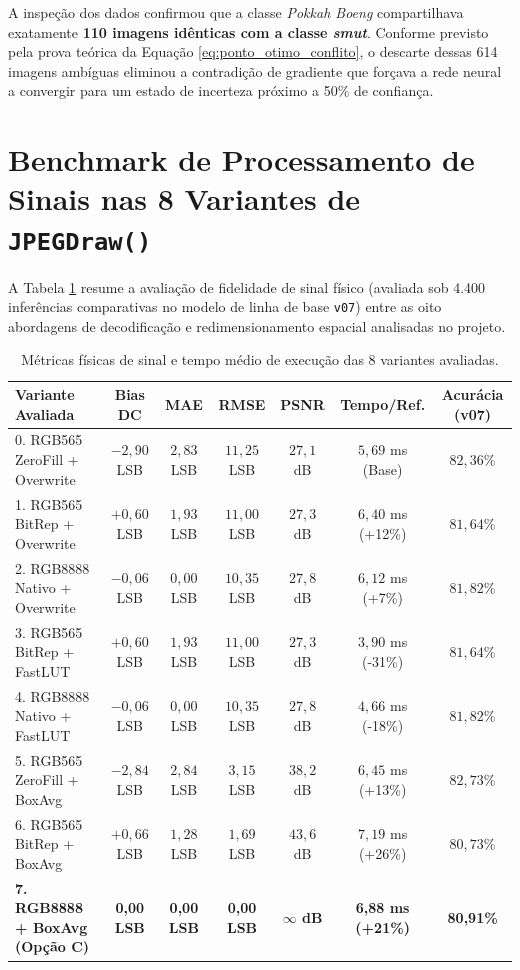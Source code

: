 A inspeção dos dados confirmou que a classe \textit{Pokkah Boeng} compartilhava exatamente \textbf{110 imagens idênticas com a classe \textit{smut}}. Conforme previsto pela prova teórica da Equação \ref{eq:ponto_otimo_conflito}, o descarte dessas 614 imagens ambíguas eliminou a contradição de gradiente que forçava a rede neural a convergir para um estado de incerteza próximo a 50\% de confiança.

\section{Benchmark de Processamento de Sinais nas 8 Variantes de \texttt{JPEGDraw()}}

A Tabela \ref{tab:benchmark_jpegdraw} resume a avaliação de fidelidade de sinal físico (avaliada sob 4.400 inferências comparativas no modelo de linha de base \texttt{v07}) entre as oito abordagens de decodificação e redimensionamento espacial analisadas no projeto.

\begin{table}[H]
\centering
\small
\caption{Métricas físicas de sinal e tempo médio de execução das 8 variantes avaliadas.}
\label{tab:benchmark_jpegdraw}
\begin{tabular}{lcccccc}
\toprule
\textbf{Variante Avaliada} & \textbf{Bias DC} & \textbf{MAE} & \textbf{RMSE} & \textbf{PSNR} & \textbf{Tempo/Ref.} & \textbf{Acurácia (v07)} \\
\midrule
0. RGB565 ZeroFill + Overwrite  & $-2,90$ LSB & $2,83$ LSB & $11,25$ LSB & $27,1$ dB & $5,69$ ms (Base) & $82,36\%$ \\
1. RGB565 BitRep + Overwrite    & $+0,60$ LSB & $1,93$ LSB & $11,00$ LSB & $27,3$ dB & $6,40$ ms (+12\%) & $81,64\%$ \\
2. RGB8888 Nativo + Overwrite   & $-0,06$ LSB & $0,00$ LSB & $10,35$ LSB & $27,8$ dB & $6,12$ ms (+7\%)  & $81,82\%$ \\
3. RGB565 BitRep + FastLUT      & $+0,60$ LSB & $1,93$ LSB & $11,00$ LSB & $27,3$ dB & $3,90$ ms (-31\%) & $81,64\%$ \\
4. RGB8888 Nativo + FastLUT     & $-0,06$ LSB & $0,00$ LSB & $10,35$ LSB & $27,8$ dB & $4,66$ ms (-18\%) & $81,82\%$ \\
5. RGB565 ZeroFill + BoxAvg     & $-2,84$ LSB & $2,84$ LSB & $3,15$ LSB  & $38,2$ dB & $6,45$ ms (+13\%) & $82,73\%$ \\
6. RGB565 BitRep + BoxAvg       & $+0,66$ LSB & $1,28$ LSB & $1,69$ LSB  & $43,6$ dB & $7,19$ ms (+26\%) & $80,73\%$ \\
\textbf{7. RGB8888 + BoxAvg (Opção C)} & \textbf{0,00 LSB} & \textbf{0,00 LSB} & \textbf{0,00 LSB} & \textbf{$\infty$ dB} & \textbf{6,88 ms (+21\%)} & \textbf{80,91\%} \\
\bottomrule
\end{tabular}
\end{table}


